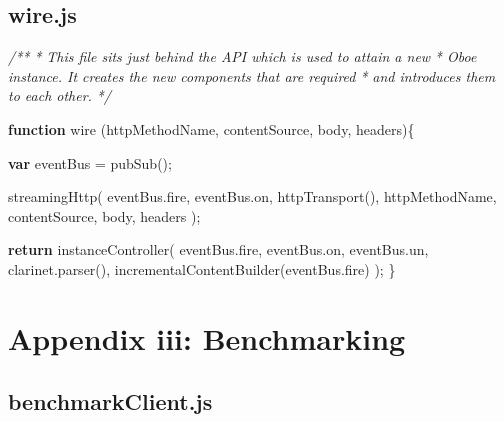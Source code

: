 \documentclass[]{article}
\let\stdsection\section
\renewcommand\section{\newpage\stdsection}
\newenvironment{Shaded}{}{}
\newcommand{\KeywordTok}[1]{\textcolor[rgb]{0.00,0.44,0.13}{\textbf{{#1}}}}
\newcommand{\CommentTok}[1]{\textcolor[rgb]{0.38,0.63,0.69}{\textit{{#1}}}}
\newcommand{\OtherTok}[1]{\textcolor[rgb]{0.00,0.44,0.13}{{#1}}}
\newcommand{\FunctionTok}[1]{\textcolor[rgb]{0.02,0.16,0.49}{{#1}}}
\newcommand{\NormalTok}[1]{{#1}}
\begin{document}
\pagebreak

\subsection{wire.js}

\begin{Shaded}
\begin{Highlighting}[]
\CommentTok{/**}
\CommentTok{ * This file sits just behind the API which is used to attain a new}
\CommentTok{ * Oboe instance. It creates the new components that are required}
\CommentTok{ * and introduces them to each other.}
\CommentTok{ */}

\KeywordTok{function} \FunctionTok{wire} \NormalTok{(httpMethodName, contentSource, body, headers)\{}

   \KeywordTok{var} \NormalTok{eventBus = }\FunctionTok{pubSub}\NormalTok{();}
               
   \FunctionTok{streamingHttp}\NormalTok{( }\OtherTok{eventBus}\NormalTok{.}\FunctionTok{fire}\NormalTok{, }\OtherTok{eventBus}\NormalTok{.}\FunctionTok{on}\NormalTok{,}
                  \FunctionTok{httpTransport}\NormalTok{(), }
                  \NormalTok{httpMethodName, contentSource, body, headers );                              }
     
   \KeywordTok{return} \FunctionTok{instanceController}\NormalTok{( }
               \OtherTok{eventBus}\NormalTok{.}\FunctionTok{fire}\NormalTok{, }\OtherTok{eventBus}\NormalTok{.}\FunctionTok{on}\NormalTok{, }\OtherTok{eventBus}\NormalTok{.}\FunctionTok{un}\NormalTok{, }
               \OtherTok{clarinet}\NormalTok{.}\FunctionTok{parser}\NormalTok{(), }
               \FunctionTok{incrementalContentBuilder}\NormalTok{(}\OtherTok{eventBus}\NormalTok{.}\FunctionTok{fire}\NormalTok{) }
   \NormalTok{);}
\NormalTok{\}}
\end{Highlighting}
\end{Shaded}

\section{Appendix iii: Benchmarking}

\subsection{benchmarkClient.js}
\end{document}
